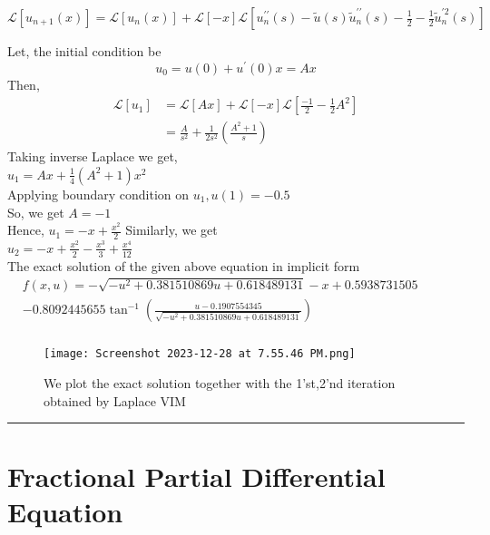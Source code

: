 \documentclass[12pt, a4paper]{report}
\begin{document}
$ \mathcal{L}\left[u_{n+1}(x)\right]=\mathcal{L}\left[u_n(x)\right]+\mathcal{L}[-x] \mathcal{L}\left[u_n^{\prime \prime}(s)-\tilde{u}(s) \tilde{u}_n^{\prime \prime}(s)-\frac{1}{2}-\frac{1}{2} \tilde{u}_n^{\prime 2}(s)\right]
$

Let, the initial condition be
$$
u_0=u(0)+u^{\prime}(0) x=A x
$$
Then,
$$
\begin{aligned}
\mathcal{L}\left[u_1\right] & =\mathcal{L}[A x]+\mathcal{L}[-x] \mathcal{L}\left[\frac{-1}{2}-\frac{1}{2} A^2\right] \\
& =\frac{A}{s^2}+\frac{1}{2 s^2}\left(\frac{A^2+1}{s}\right)
\end{aligned}
$$
Taking inverse Laplace we get,\\
$ u_1=A x+\frac{1}{4}\left(A^2+1\right) x^2 $\\
Applying boundary condition on $u_1, u(1)=-0.5$\\
So, we get $A=-1$ \\
Hence,
$
u_1=-x+\frac{x^2}{2}
$
Similarly, we get \\
$ u_2=-x+\frac{x^2}{2}-\frac{x^3}{3}+\frac{x^4}{12}$\\
The exact solution of the given above equation in implicit form \\
$\begin{aligned} & f(x, u)=-\sqrt{-u^2+0.381510869 u+0.618489131}-x+0.5938731505 \\ & -0.8092445655 \tan ^{-1}\left(\frac{u-0.1907554345}{\sqrt{-u^2+0.381510869 u+0.618489131}}\right) \\ & \end{aligned}$ \\
\begin{figure}[h]
    \centering
    \texttt{[image: Screenshot 2023-12-28 at 7.55.46 PM.png]}
    \caption{We plot the exact solution together with the 1'st,2'nd iteration obtained by Laplace VIM}
    \label{fig:enter-label}
\end{figure}
\clearpage
\bigskip

\rule{\textwidth}{1.4pt}

\bigskip

\chapter{\textbf{\LARGE Fractional Partial Differential Equation}}
\end{document}
